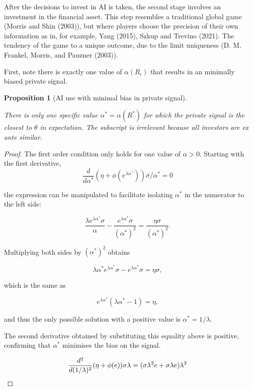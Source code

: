 \documentclass[
]{article}
\theoremstyle{plain}
\newtheorem{proposition}{Proposition}[section]
\theoremstyle{remark}
\begin{document}
After the decisions to invest in AI is taken, the second stage involves
an investment in the financial asset. This step resembles a traditional
global game (Morris and Shin (2003)), but where players choose the
precision of their own information as in, for example, Yang (2015),
Szkup and Trevino (2021). The tendency of the game to a unique outcome,
due to the limit uniqueness (D. M. Frankel, Morris, and Pauzner (2003)).

First, note there is exactly one value of \(\alpha(R_i)\) that results
in an minimally biased private signal.

\begin{proposition}[AI use with minimal bias in private
signal]\protect\hypertarget{prp-alphainvestunbiased}{}\label{prp-alphainvestunbiased}

There is only one specific value \(\alpha^* = \alpha(R^*)\) for which
the private signal is the closest to \(\theta\) in expectation. The
subscript is irrelevant because all investors are ex ante similar.

\end{proposition}

\begin{proof}

The first order condition only holds for one value of \(\alpha > 0\).
Starting with the first derivative, \[
\frac{d}{d \alpha^*} (\eta + \phi(e^{\lambda \alpha^*})) \sigma / \alpha^* = 0
\]

the expression can be manipulated to facilitate isolating \(\alpha^*\)
in the numerator to the left side:

\[
\frac{\lambda e^{\lambda \alpha^*} \sigma}{\alpha} - \frac{e^{\lambda \alpha^*}\sigma}{(\alpha^*)^2} = \frac{\eta \sigma}{(\alpha^*)^2}.
\]

Multiplying both sides by \((\alpha^*)^2\) obtains

\[
\lambda \alpha^* e^{\lambda \alpha^*} \sigma - e^{\lambda \alpha^*}\sigma = \eta \sigma,
\]

which is the same as

\[
e^{\lambda \alpha^*} (\lambda \alpha^* - 1)= \eta,
\]

and thus the only possible solution with a positive value is
\(\alpha^* = 1/\lambda\).

The second derivative obtained by substituting this equality above is
positive, confirming that \(\alpha^*\) minimises the bias on the signal.

\[
\frac{d^2}{d (1/\lambda)^2} (\eta + \phi(e)) \sigma \lambda = (\sigma \lambda^2 e + \sigma \lambda e)\lambda^3 \\
\]

\end{proof}
\end{document}
